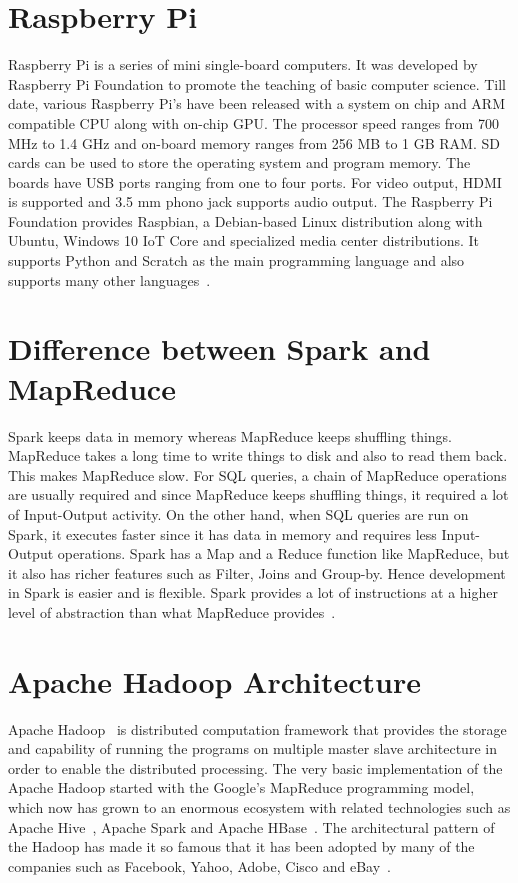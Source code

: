 \section{Raspberry Pi}

Raspberry Pi is a series of mini single-board computers. 
It was developed by Raspberry Pi Foundation to promote the teaching of basic 
computer science. Till date, various Raspberry Pi's have been released with a 
system on chip and ARM compatible CPU along with on-chip GPU. The processor 
speed ranges from 700 MHz to 1.4 GHz and on-board memory ranges from 256 MB to 
1 GB RAM. SD cards can be used to store the operating system and program memory.
The boards have USB ports ranging from one to four ports. For video output, HDMI
is supported and 3.5 mm phono jack supports audio output. The Raspberry Pi 
Foundation provides Raspbian, a Debian-based Linux distribution along with 
Ubuntu, Windows 10 IoT Core and specialized media center distributions. It 
supports Python and Scratch as the main programming language and also supports 
many other languages~\cite{hid-sp18-408-Raspberry-Pi}.

\section{Difference between Spark and MapReduce}

Spark keeps data in memory whereas MapReduce keeps shuffling things. MapReduce 
takes a long time to write things to disk and also to read them back. This makes
MapReduce slow. For SQL queries, a chain of MapReduce operations are usually 
required and since MapReduce keeps shuffling things, it required a lot of 
Input-Output activity. On the other hand, when SQL queries are run on Spark, it 
executes faster since it has data in memory and requires less Input-Output 
operations. Spark has a Map and a Reduce function like MapReduce, but it also 
has richer features such as Filter, Joins and Group-by. Hence development in 
Spark is easier and is flexible. Spark provides a lot of instructions at a 
higher level of abstraction than what 
MapReduce provides~\cite{hid-sp18-408-Difference}.

\section{Apache Hadoop Architecture}

Apache Hadoop~\cite{hid-sp18-412-ApacheHadoop} is distributed computation 
framework that provides the storage and capability of running the programs on 
multiple master slave architecture in order to enable the distributed 
processing. The very basic implementation of the Apache Hadoop started with the 
Google’s MapReduce programming model, which now has grown to an 
enormous ecosystem with related technologies such as 
Apache Hive~\cite{hid-sp18-410-hive}, Apache Spark and 
Apache HBase~\cite{hid-sp18-406-hbase}. The architectural pattern of the Hadoop 
has made it so famous that it has been adopted by many of the companies such as 
Facebook, Yahoo, Adobe, Cisco and 
eBay~\cite{hid-sp18-412-hadoop-architecture-overview}.

